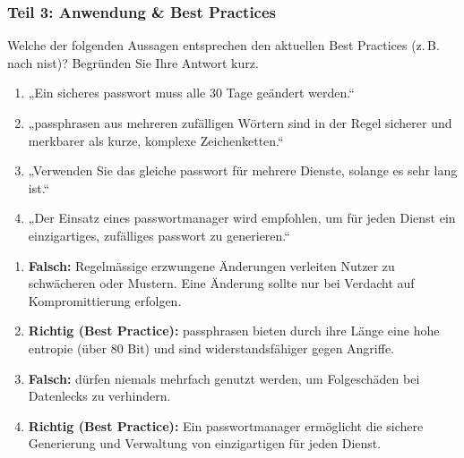 \documentclass[12pt,a4paper]{article}
\begin{document}
\subsubsection{Teil 3: Anwendung \& Best Practices}

\begin{taskbox}
Welche der folgenden Aussagen entsprechen den aktuellen Best Practices \newline(z.\,B. nach \gls{nist})? Begründen Sie Ihre Antwort kurz.
\begin{enumerate}[label=\Alph*)]
    \item „Ein sicheres \gls{passwort} muss alle 30 Tage geändert werden.“
    \item „\gls{passphrase}n aus mehreren zufälligen Wörtern sind in der Regel sicherer und merkbarer als kurze, komplexe Zeichenketten.“
    \item „Verwenden Sie das gleiche \gls{passwort} für mehrere Dienste, solange es sehr lang ist.“
    \item „Der Einsatz eines \gls{passwortmanager} wird empfohlen, um für jeden Dienst ein einzigartiges, zufälliges \gls{passwort} zu generieren.“
\end{enumerate}
\end{taskbox}

\begin{solutionbox}
\begin{enumerate}[label=\Alph*)]
    \item \textbf{Falsch:} Regelmässige erzwungene Änderungen verleiten Nutzer zu \mbox{schwächeren}  oder Mustern. Eine Änderung sollte nur bei Verdacht auf Kompromittierung erfolgen.
    \item \textbf{Richtig (Best Practice):} \gls{passphrase}n bieten durch ihre Länge eine hohe \gls{entropie} (über 80 Bit) und sind widerstandsfähiger gegen Angriffe.
    \item \textbf{Falsch:}  dürfen niemals mehrfach genutzt werden, um \mbox{Folgeschäden} bei Datenlecks zu verhindern.
    \item \textbf{Richtig (Best Practice):} Ein \gls{passwortmanager} ermöglicht die sichere \mbox{Generierung} und Verwaltung von einzigartigen  für jeden Dienst.
\end{enumerate}
\end{solutionbox}

\newpage
\end{document}

